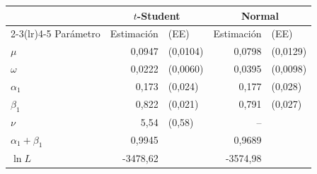 \begin{tabular}{lr@{\,}lr@{\,}l}
\toprule
 & \multicolumn{2}{c}{$t$-Student} & \multicolumn{2}{c}{Normal} \\
\cmidrule(lr){2-3}\cmidrule(lr){4-5}
Parámetro & Estimación & (EE) & Estimación & (EE) \\
\midrule
$\mu$ & 0{,}0947 & (0{,}0104) & 0{,}0798 & (0{,}0129) \\
$\omega$ & 0{,}0222 & (0{,}0060) & 0{,}0395 & (0{,}0098) \\
$\alpha_1$ & 0{,}173 & (0{,}024) & 0{,}177 & (0{,}028) \\
$\beta_1$ & 0{,}822 & (0{,}021) & 0{,}791 & (0{,}027) \\
$\nu$ & 5{,}54 & (0{,}58) & -- &  \\
\midrule
$\alpha_1+\beta_1$ & 0{,}9945 & & 0{,}9689 & \\
$\ln L$ & -3478{,}62 & & -3574{,}98 & \\
\bottomrule
\end{tabular}
